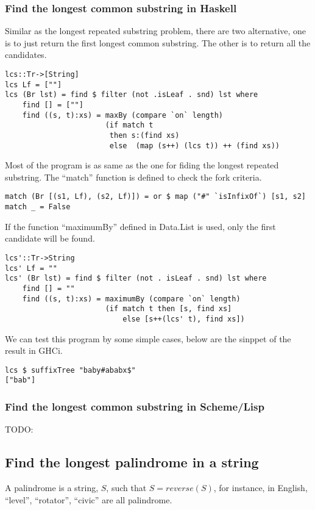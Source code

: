 \documentclass{article}
\begin{document}
\subsubsection*{Find the longest common substring in Haskell}
Similar as the longest repeated substring problem, there
are two alternative, one is to just return the first longest
common substring. The other is to return all the candidates.

\lstset{language=Haskell}
\begin{lstlisting}
lcs::Tr->[String]
lcs Lf = [""]
lcs (Br lst) = find $ filter (not .isLeaf . snd) lst where
    find [] = [""]
    find ((s, t):xs) = maxBy (compare `on` length) 
                       (if match t 
                        then s:(find xs)
                        else  (map (s++) (lcs t)) ++ (find xs))
\end{lstlisting} %

Most of the program is as same as the one for fiding the longest
repeated substring. The ``match'' function is defined to check
the fork criteria.

\begin{lstlisting}
match (Br [(s1, Lf), (s2, Lf)]) = or $ map ("#" `isInfixOf`) [s1, s2]
match _ = False
\end{lstlisting} %

If the function ``maximumBy'' defined in Data.List is used, only
the first candidate will be found.

\begin{lstlisting}
lcs'::Tr->String
lcs' Lf = ""
lcs' (Br lst) = find $ filter (not . isLeaf . snd) lst where
    find [] = ""
    find ((s, t):xs) = maximumBy (compare `on` length) 
                       (if match t then [s, find xs]
                           else [s++(lcs' t), find xs])
\end{lstlisting} %

We can test this program by some simple cases, below are the
sinppet of the result in GHCi.

\begin{lstlisting}
lcs $ suffixTree "baby#ababx$"
["bab"]
\end{lstlisting}

\subsubsection*{Find the longest common substring in Scheme/Lisp}
TODO:

\subsection{Find the longest palindrome in a string}
A palindrome is a string, $S$, such that $S=reverse(S)$, for instance,
in English, ``level'', ``rotator'', ``civic'' are all palindrome.
\end{document}
